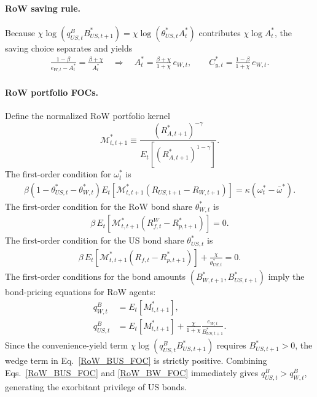 \documentclass{article}
\begin{document}
\paragraph{RoW saving rule.}
Because $\chi\log(q^B_{US,t}B_{US,t+1}^*)=\chi\log(\theta_{US,t}^*A_t^*)$ contributes $\chi\log A_t^*$, the saving choice separates and yields
\begin{align}\label{RoW_saving_rule_bond_cost}
\frac{1-\beta}{e_{W,t}-A_t^*}=\frac{\beta+\chi}{A_t^*}
\quad\Rightarrow\quad
A_t^*=\frac{\beta+\chi}{1+\chi}\,e_{W,t},
\qquad
C^*_{y,t}=\frac{1-\beta}{1+\chi}\,e_{W,t}.
\end{align}

\paragraph{RoW portfolio FOCs.}
Define the normalized RoW portfolio kernel
\[
\mathcal M_{t,t+1}^* \equiv \frac{(R_{A,t+1}^*)^{-\gamma}}{E_t\!\left[(R_{A,t+1}^*)^{1-\gamma}\right]}.
\]
The first-order condition for $\omega_t^*$ is
\begin{align}\label{RoW_omega_FOC_mod}
\beta(1-\theta_{US,t}^*-\theta_{W,t}^*)
E_t\!\left[\mathcal M_{t,t+1}^*(R_{US,t+1}-R_{W,t+1})\right]
=
\kappa(\omega_t^*-\bar\omega^*).
\end{align}
The first-order condition for the RoW bond share $\theta_{W,t}^*$ is
\begin{align}\label{RoW_thetaW_FOC_mod}
\beta\,E_t\!\left[\mathcal M_{t,t+1}^*(R_{f,t}^W-R_{p,t+1}^*)\right]
=
0.
\end{align}
The first-order condition for the US bond share $\theta_{US,t}^*$ is
\begin{align}\label{RoW_thetaUS_FOC_mod}
\beta\,E_t\!\left[\mathcal M_{t,t+1}^*(R_{f,t}-R_{p,t+1}^*)\right]
+\frac{\chi}{\theta_{US,t}^*}
=
0.
\end{align}
The first-order conditions for the bond amounts $(B_{W,t+1}^*,B_{US,t+1}^*)$ imply the bond-pricing equations for RoW agents:
\begin{align}
q^B_{W,t}&=E_t\!\left[M^*_{t,t+1}\right], \label{RoW_BW_FOC}\\
q^B_{US,t}&=E_t\!\left[M^*_{t,t+1}\right]
+\frac{\chi}{1+\chi} \frac{e_{W,t}}{B^*_{US,t+1}}. \label{RoW_BUS_FOC}
\end{align}
Since the convenience-yield term $\chi\log(q^B_{US,t}B_{US,t+1}^*)$ requires $B_{US,t+1}^*>0$, the wedge term in Eq.~\eqref{RoW_BUS_FOC} is strictly positive. Combining Eqs.~\eqref{RoW_BUS_FOC} and \eqref{RoW_BW_FOC} immediately gives $q^B_{US,t}>q^B_{W,t}$, generating the exorbitant privilege of US bonds.
\end{document}
